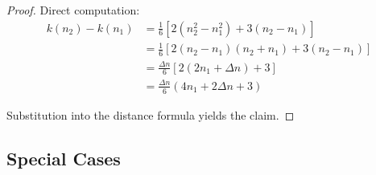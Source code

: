 \begin{proof}
Direct computation:
\begin{align}
k(n_2) - k(n_1) &= \frac{1}{6}[2(n_2^2 - n_1^2) + 3(n_2 - n_1)]\\
&= \frac{1}{6}[2(n_2 - n_1)(n_2 + n_1) + 3(n_2 - n_1)]\\
&= \frac{\Delta n}{6}[2(2n_1 + \Delta n) + 3]\\
&= \frac{\Delta n}{6}(4n_1 + 2\Delta n + 3)
\end{align}

Substitution into the distance formula yields the claim.
\end{proof}


\subsection{Special Cases}

